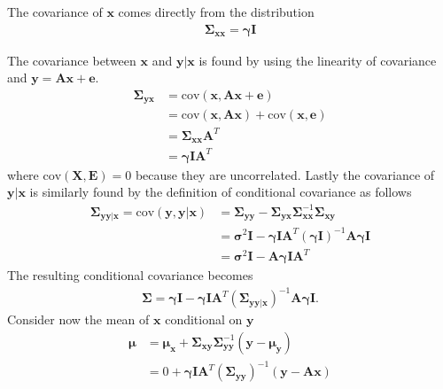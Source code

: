 The covariance of $\textbf{x}$ comes directly from the distribution  
\begin{align*}
\boldsymbol{\Sigma}_{\textbf{xx}} = \boldsymbol{\gamma}\textbf{I}
\end{align*} 

The covariance between $\textbf{x}$ and $\textbf{y}\vert\textbf{x}$ is found by using the linearity of covariance and $\textbf{y}=\textbf{Ax}+\textbf{e}$.
\begin{align*}
\boldsymbol{\Sigma}_{\textbf{yx}} &= \text{cov}\left(\textbf{x},\textbf{Ax}+\textbf{e} \right)\\ 
&= \text{cov}\left(\textbf{x},\textbf{Ax}\right)+\text{cov}\left(\textbf{x},\textbf{e}\right)\\
&= \boldsymbol{\Sigma}_{\textbf{xx}}\textbf{A}^T \\
&= \boldsymbol{\gamma}\textbf{I}\textbf{A}^T
\end{align*}
where $\text{cov}\left(\textbf{X},\textbf{E}\right)=0$ because they are uncorrelated.
Lastly the covariance of $\textbf{y}\vert \textbf{x}$ is similarly found by the definition of conditional covariance as follows 
\begin{align*}
\boldsymbol{\Sigma}_{\textbf{yy} \vert \mathbf{x}} =  \text{cov}(\textbf{y},\textbf{y}\vert \textbf{x}) &= \boldsymbol{\Sigma}_{\textbf{yy}} - \boldsymbol{\Sigma}_{\textbf{yx}}\boldsymbol{\Sigma}_{\textbf{xx}}^{-1}\boldsymbol{\Sigma}_{\textbf{xy}} \\
&= \boldsymbol{\sigma}^2 \textbf{I} - \boldsymbol{\gamma}\textbf{I}\textbf{A}^T (\boldsymbol{\gamma}\textbf{I})^{-1} \textbf{A}\boldsymbol{\gamma}\textbf{I} \\
&= \boldsymbol{\sigma}^2 \textbf{I} - \textbf{A}\boldsymbol{\gamma}\textbf{I}\textbf{A}^T
\end{align*} 
The resulting conditional covariance becomes 
\begin{align*}
\boldsymbol{\Sigma} = \boldsymbol{\gamma}\textbf{I} - \boldsymbol{\gamma}\textbf{I}\textbf{A}^T (\boldsymbol{\Sigma}_{\textbf{yy}\vert \textbf{x}})^{-1} \textbf{A} \boldsymbol{\gamma}\textbf{I}.
\end{align*}
Consider now the mean of $\textbf{x}$ conditional on $\textbf{y}$
\begin{align*}
\boldsymbol{\mu} &= \boldsymbol{\mu}_{\textbf{x}}+\boldsymbol{\Sigma}_{\textbf{xy}}\boldsymbol{\Sigma}_{\textbf{yy}}^{-1}\left( \textbf{y}-\boldsymbol{\mu}_{\textbf{y}}\right) \\
&= 0 + \boldsymbol{\gamma}\textbf{I}\textbf{A}^T \left( \boldsymbol{\Sigma}_{\textbf{yy}}\right)^{-1}\left(\textbf{y}-\textbf{Ax}\right)
\end{align*}  
